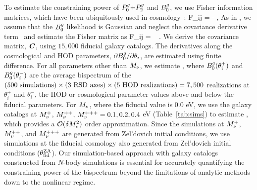 To estimate the constraining power of $P^g_0{+}P^g_2$ and $B^g_0$, we use Fisher information
matrices, which have been ubiquitously used in
cosmology~\citep[\emph{e.g.}][]{jungman1996,tegmark1997,dodelson2003,heavens2009,verde2010}: 
\beq 
F_{ij} = - \bigg \langle {} \bigg \rangle,
\eeq
As in \cite{hahn2020}, we assume that the $B^g_0$ likelihood is Gaussian and
neglect the covariance derivative term~\citep{carron2013} and estimate the
Fisher matrix as 
\beq \label{eq:fisher}
F_{ij} = ~ .
\eeq
We derive the covariance matrix, $\textbf{\textit{C}}$, using $15,000$ fiducial galaxy
catalogs. The derivatives along the cosmological and HOD
parameters, $\partial B^g_0/\partial \theta_i$, are estimated using finite
difference. For all parameters other than $M_\nu$, we estimate 
\beq 
{} \approx {}, 
\eeq
where $B^g_0(\theta_i^{+})$ and $B^g_0(\theta_i^{-})$ are the average bispectrum of the 
$(500~{\rm simulations})\times(3~{\rm RSD~axes})\times(5~{\rm
HOD~realizations}) = 7,500$
realizations at $\theta_i^{+}$ and $\theta_i^{-}$, the HOD or 
cosmological parameter values above and below the fiducial parameters.  
For $M_\nu$, where the fiducial value is 0.0 eV, we use the galaxy catalogs 
at $M_\nu^+$, $M_\nu^{++}$, $M_\nu^{+++}=0.1, 0.2, 0.4$ eV (Table~\ref{tab:sims}) 
to estimate 
\beq \label{eq:dbkdmnu} 
\frac{\partial \Bg}{\partial \smnu} \approx {}, 
\eeq
which provides a $\mathcal{O}(\delta M_\nu^2)$ order approximation. 
Since the simulations at $M_\nu^+$, $M_\nu^{++}$, and $M_\nu^{+++}$ are generated 
from Zel'dovich initial conditions, we use simulations at the fiducial cosmology 
also generated from Zel'dovich initial conditions ($\theta_{\rm fid}^{\rm ZA}$). 
Our simulation-based approach with galaxy catalogs constructed from
$N$-body simulations is essential for accurately quantifying the constraining power
of the bispectrum beyond the limitations of analytic methods down to the nonlinear
regime.
